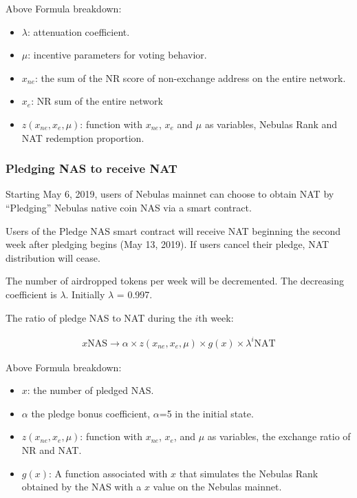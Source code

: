 Above Formula breakdown:

\begin{itemize}
	\item $\lambda$: attenuation coefficient.
	\item $\mu$: incentive parameters for voting behavior.
	\item $x_{ne}$: the sum of the NR score of non-exchange address on the entire network.
	\item $x_{e}$: NR sum of the entire network	
	\item $z(x_{ne},x_{e},\mu)$: function with $x_{ne}$, $x_{e}$ and $\mu$ as variables, Nebulas Rank and NAT redemption proportion.
\end{itemize}

\subsubsection{Pledging NAS to receive NAT}

Starting May 6, 2019, users of Nebulas mainnet can choose to obtain NAT by “Pledging” Nebulas native coin NAS via a smart contract.

Users of the Pledge NAS smart contract will receive NAT beginning the second week after pledging begins (May 13, 2019). If users cancel their pledge, NAT distribution will cease.

The number of airdropped tokens per week will be decremented. The decreasing coefficient is $\lambda$. Initially $\lambda$ = 0.997.

The ratio of pledge NAS to NAT during the $i$th week:

\begin{align}
x \text{NAS} \rightarrow \alpha \times z(x_{ne},x_{e},\mu)\times g(x) \times \lambda^{i} \text{NAT}
\end{align}

Above Formula breakdown:

\begin{itemize}
	\item $x$: the number of pledged NAS.
	\item $\alpha$ the pledge bonus coefficient, $\alpha$=5 in the initial state.
	\item $z(x_{ne},x_{e},\mu)$: function with $x_{ne}$, $x_{e}$, and $\mu$ as variables, the exchange ratio of NR and NAT.
	\item $g(x)$: A function associated with $x$ that simulates the Nebulas Rank obtained by the NAS with a $x$ value on the Nebulas mainnet.
\end{itemize}

